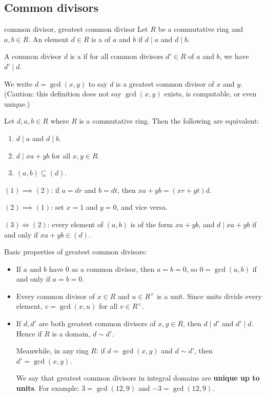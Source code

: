 \documentclass[12pt,letterpaper]{report}
\begin{document}
\pagebreak
\subsection{Common divisors}

\begin{defn}{common divisor, greatest common divisor}{}
  Let $R$ be a commutative ring and $a, b \in R$.
  An element $d \in R$ is a  of $a$ and $b$ if $d \mid a$ and $d \mid b$.

  A common divisor $d$ is a  if for all common divisors $d' \in R$
  of $a$ and $b$, we have $d' \mid d$.

  We write $d = \gcd(x, y)$ to say $d$ is a greatest common divisor of $x$ and $y$.
  (Caution: this definition does not say $\gcd(x, y)$ exists, is computable, or even unique.)
\end{defn}

\begin{lem}{}{}
  Let $d, a, b \in R$ where $R$ is a commutative ring.
  Then the following are equivalent:
  \begin{enumerate}
    \item $d \mid a$ and $d \mid b$.
    \item $d \mid xa + yb$ for all $x, y \in R$.
    \item $(a, b) \subseteq (d)$.
  \end{enumerate}
\end{lem}

\begin{thmproof}
  $(1) \implies (2)$: if $a = dr$ and $b = dt$, then $xa + yb = (xr + yt)d$.

  $(2) \implies (1)$: set $x = 1$ and $y = 0$, and vice versa.

  $(3) \iff (2)$: every element of $(a, b)$ is of the form $xa + yb$, and
  $d \mid xa + yb$ if and only if $xa + yb \in (d)$.
\end{thmproof}

Basic properties of greatest common divisors:
\begin{itemize}
  \item If $a$ and $b$ have 0 as a common divisor, then $a = b = 0$, so $0 = \gcd(a, b)$ if and
    only if $a = b = 0$.
  \item Every common divisor of $x \in R$ and $u \in R^\times$ is a unit.
    Since units divide every element, $v = \gcd(x, u)$ for all $v \in R^\times$.
  \item If $d, d'$ are both greatest common divisors of $x, y \in R$, then $d \mid d'$ and
    $d' \mid d$.
    Hence if $R$ is a domain, $d \sim d'$.

    Meanwhile, in any ring $R$: if $d = \gcd(x, y)$ and $d \sim d'$, then $d' = \gcd(x, y)$.

    We say that greatest common divisors in integral domains are \textbf{unique up to units}.
    For example: $3 = \gcd(12, 9)$ and $-3 = \gcd(12, 9)$.
\end{itemize}
\end{document}
